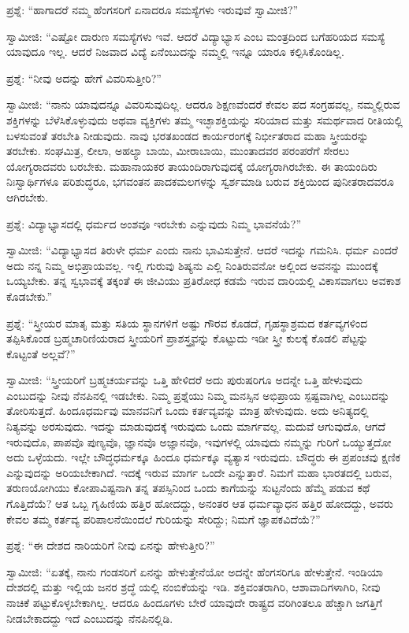 ಪ್ರಶ್ನೆ: “ಹಾಗಾದರೆ ನಮ್ಮ ಹೆಂಗಸರಿಗೆ ಏನಾದರೂ ಸಮಸ್ಯೆಗಳು ಇರುವುವೆ ಸ್ವಾಮೀಜಿ?”

ಸ್ವಾಮೀಜಿ: “ಎಷ್ಟೋ ದಾರುಣ ಸಮಸ್ಯೆಗಳು ಇವೆ. ಆದರೆ ವಿದ್ಯಾಭ್ಯಾಸ ಎಂಬ ಮಂತ್ರದಿಂದ ಬಗೆಹರಿಯದ ಸಮಸ್ಯೆ ಯಾವುದೂ ಇಲ್ಲ. ಆದರೆ ನಿಜವಾದ ವಿದ್ಯೆ ಏನೆಂಬುದನ್ನು ನಮ್ಮಲ್ಲಿ ಇನ್ನೂ ಯಾರೂ ಕಲ್ಪಿಸಿಕೊಂಡಿಲ್ಲ.

ಪ್ರಶ್ನೆ: “ನೀವು ಅದನ್ನು ಹೇಗೆ ವಿವರಿಸುತ್ತೀರಿ?”

ಸ್ವಾಮೀಜಿ: “ನಾನು ಯಾವುದನ್ನೂ ವಿವರಿಸುವುದಿಲ್ಲ. ಆದರೂ ಶಿಕ್ಷಣವೆಂದರೆ ಕೇವಲ ಪದ ಸಂಗ್ರಹವಲ್ಲ, ನಮ್ಮಲ್ಲಿರುವ ಶಕ್ತಿಗಳನ್ನು ಬೆಳೆಸಿಕೊಳ್ಳುವುದು ಅಥವಾ ವ್ಯಕ್ತಿಗಳು ತಮ್ಮ ಇಚ್ಛಾಶಕ್ತಿಯನ್ನು ಸರಿಯಾದ ಮತ್ತು ಸಮರ್ಥವಾದ ರೀತಿಯಲ್ಲಿ ಬಳಸುವಂತೆ ತರಬೇತಿ ನೀಡುವುದು. ನಾವು ಭರತಖಂಡದ ಕಾರ್ಯರಂಗಕ್ಕೆ ನಿರ್ಭೀತರಾದ ಮಹಾ ಸ್ತ್ರೀಯರನ್ನು ತರಬೇಕು. ಸಂಘಮಿತ್ರ, ಲೀಲಾ, ಅಹಲ್ಯಾ ಬಾಯಿ, ಮೀರಾಬಾಯಿ, ಮುಂತಾದವರ ಪರಂಪರೆಗೆ ಸೇರಲು ಯೋಗ್ಯರಾದವರು ಬರಬೇಕು. ಮಹಾನಾಯಕರ ತಾಯಂದಿರಾಗುವುದಕ್ಕೆ ಯೋಗ್ಯರಾಗಿರಬೇಕು. ಈ ತಾಯಂದಿರು ನಿಃಸ್ವಾರ್ಥಿಗಳೂ ಪರಿಶುದ್ಧರೂ, ಭಗವಂತನ ಪಾದಕಮಲಗಳನ್ನು ಸ್ವರ್ಶಮಾಡಿ ಬರುವ ಶಕ್ತಿಯಿಂದ ಪುನೀತರಾದವರೂ ಆಗಿರಬೇಕು.

ಪ್ರಶ್ನೆ: ವಿದ್ಯಾಭ್ಯಾಸದಲ್ಲಿ ಧರ್ಮದ ಅಂಶವೂ ಇರಬೇಕು ಎನ್ನುವುದು ನಿಮ್ಮ ಭಾವನೆಯೆ?”

ಸ್ವಾಮೀಜಿ: “ವಿದ್ಯಾಭ್ಯಾಸದ ತಿರುಳೇ ಧರ್ಮ ಎಂದು ನಾನು ಭಾವಿಸುತ್ತೇನೆ. ಆದರೆ ಇದನ್ನು ಗಮನಿಸಿ. ಧರ್ಮ ಎಂದರೆ ಅದು ನನ್ನ ನಿಮ್ಮ ಅಭಿಪ್ರಾಯವಲ್ಲ. ಇಲ್ಲಿ ಗುರುವು ಶಿಷ್ಯನು ಎಲ್ಲಿ ನಿಂತಿರುವನೋ ಅಲ್ಲಿಂದ ಅವನನ್ನು ಮುಂದಕ್ಕೆ ಒಯ್ಯಬೇಕು. ತನ್ನ ಸ್ವಭಾವಕ್ಕೆ ತಕ್ಕಂತೆ ಈ ಜೀವಿಯು ಪ್ರತಿರೋಧ ಕಡಮೆ ಇರುವ ದಾರಿಯಲ್ಲಿ ವಿಕಾಸವಾಗಲು ಅವಕಾಶ ಕೊಡಬೇಕು.”

ಪ್ರಶ್ನೆ: “ಸ್ತ್ರೀಯರ ಮಾತೃ ಮತ್ತು ಸತಿಯ ಸ್ಥಾನಗಳಿಗೆ ಅಷ್ಟು ಗೌರವ ಕೊಡದೆ, ಗೃಹಸ್ಥಾಶ್ರಮದ ಕರ್ತವ್ಯಗಳಿಂದ ತಪ್ಪಿಸಿಕೊಂಡ ಬ್ರಹ್ಮಚಾರಿಣಿಯರಾದ ಸ್ತ್ರೀಯರಿಗೆ ಪ್ರಾಶಸ್ತ್ರ್ಯವನ್ನು ಕೊಟ್ಟುದು ಇಡೀ ಸ್ತ್ರೀ ಕುಲಕ್ಕೆ ಕೊಡಲಿ ಪೆಟ್ಟನ್ನು ಕೊಟ್ಟಂತೆ ಅಲ್ಲವೆ?”

ಸ್ವಾಮೀಜಿ: “ಸ್ತ್ರೀಯರಿಗೆ ಬ್ರಹ್ಮಚರ್ಯವನ್ನು ಒತ್ತಿ ಹೇಳಿದರೆ ಅದು ಪುರುಷರಿಗೂ ಅದನ್ನೇ ಒತ್ತಿ ಹೇಳುವುದು ಎಂಬುದನ್ನು ನೀವು ನೆನಪಿನಲ್ಲಿ ಇಡಬೇಕು. ನಿಮ್ಮ ಪ್ರಶ್ನೆಯು ನಿಮ್ಮ ಮನಸ್ಸಿನ ಅಭಿಪ್ರಾಯ ಸ್ಪಷ್ಟವಾಗಿಲ್ಲ ಎಂಬುದನ್ನು ತೋರಿಸುತ್ತದೆ. ಹಿಂದೂಧರ್ಮವು ಮಾನವನಿಗೆ ಒಂದು ಕರ್ತವ್ಯವನ್ನು ಮಾತ್ರ ಹೇಳುವುದು. ಅದು ಅನಿತ್ಯದಲ್ಲಿ ನಿತ್ಯವನ್ನು ಅರಸುವುದು. ಇದನ್ನು ಮಾಡುವುದಕ್ಕೆ ಇರುವುದು ಒಂದು ಮಾರ್ಗವಲ್ಲ. ಮದುವೆ ಆಗುವುದೊ, ಆಗದೆ ಇರುವುದೊ, ಪಾಪವೊ ಪುಣ್ಯವೊ, ಜ್ಞಾನವೊ ಅಜ್ಞಾನವೊ, ಇವುಗಳಲ್ಲಿ ಯಾವುದು ನಮ್ಮನ್ನು ಗುರಿಗೆ ಒಯ್ಯುತ್ತದೋ ಅದು ಒಳ್ಳೆಯದು. ಇಲ್ಲೇ ಬೌದ್ಧಧರ್ಮಕ್ಕೂ ಹಿಂದೂ ಧರ್ಮಕ್ಕೂ ವ್ಯತ್ಯಾಸ ಇರುವುದು. ಬೌದ್ಧರು ಈ ಪ್ರಪಂಚವು ಕ್ಷಣಿಕ ಎನ್ನುವುದನ್ನು ಅರಿಯಬೇಕಾಗಿದೆ. ಇದಕ್ಕೆ ಇರುವ ಮಾರ್ಗ ಒಂದೇ ಎನ್ನುತ್ತಾರೆ. ನಿಮಗೆ ಮಹಾ ಭಾರತದಲ್ಲಿ ಬರುವ, ತರುಣಯೋಗಿಯು ಕೋಪಾವಿಷ್ಟನಾಗಿ ತನ್ನ ತಪಸ್ಸಿನಿಂದ ಒಂದು ಕಾಗೆಯನ್ನು ಸುಟ್ಟನೆಂದು ಹೆಮ್ಮೆ ಪಡುವ ಕಥೆ ಗೊತ್ತಿದೆಯೆ? ಆತ ಒಬ್ಬ ಗೃಹಿಣಿಯ ಹತ್ತಿರ ಹೋದದ್ದು, ಅನಂತರ ಆತ ಧರ್ಮವ್ಯಾಧನ ಹತ್ತಿರ ಹೋದದ್ದು, ಅವರು ಕೇವಲ ತಮ್ಮ ಕರ್ತವ್ಯ ಪರಿಪಾಲನೆಯಿಂದಲೆ ಗುರಿಯನ್ನು ಸೇರಿದ್ದು; ನಿಮಗೆ ಜ್ಞಾಪಕವಿದೆಯೆ?”

ಪ್ರಶ್ನೆ: “ಈ ದೇಶದ ನಾರಿಯರಿಗೆ ನೀವು ಏನನ್ನು ಹೇಳುತ್ತೀರಿ?”

ಸ್ವಾಮೀಜಿ: “ಏತಕ್ಕೆ, ನಾನು ಗಂಡಸರಿಗೆ ಏನನ್ನು ಹೇಳುತ್ತೇನೆಯೋ ಅದನ್ನೇ ಹೆಂಗಸರಿಗೂ ಹೇಳುತ್ತೇನೆ. ಇಂಡಿಯಾ ದೇಶದಲ್ಲಿ ಮತ್ತು ಇಲ್ಲಿಯ ಜನರ ಶ್ರದ್ಧೆ ಯಲ್ಲಿ ನಂಬಿಕೆಯನ್ನು ಇಡಿ. ಶಕ್ತಿವಂತರಾಗಿರಿ, ಆಶಾವಾದಿಗಳಾಗಿರಿ, ನೀವು ನಾಚಿಕೆ ಪಟ್ಟುಕೊಳ್ಳಬೇಕಾಗಿಲ್ಲ. ಆದರೂ ಹಿಂದೂಗಳು ಬೇರೆ ಯಾವುದೇ ರಾಷ್ಟ್ರದ ವರಿಗಿಂತಲೂ ಹೆಚ್ಚಾಗಿ ಜಗತ್ತಿಗೆ ನೀಡಬೇಕಾದದ್ದು ಇದೆ ಎಂಬುದನ್ನು ನೆನಪಿನಲ್ಲಿಡಿ.

